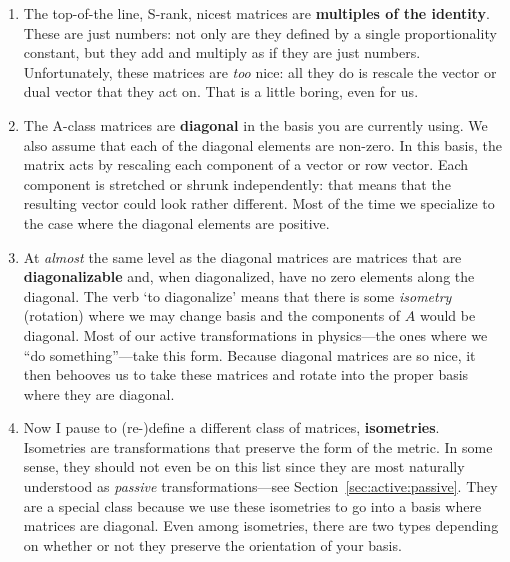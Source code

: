 \begin{enumerate}
    \item The top-of-the line, S-rank, nicest matrices are \textbf{multiples of the identity}. These are just numbers: not only are they defined by a single proportionality constant, but they add and multiply as if they are just numbers. Unfortunately, these matrices are \emph{too} nice: all they do is rescale the vector or dual vector that they act on. That is a little boring, even for us.
    \item The A-class matrices are \textbf{diagonal} in the basis you are currently using. We also assume that each of the diagonal elements are non-zero. In this basis, the matrix acts by rescaling each component of a vector or row vector. Each component is stretched or shrunk independently: that means that the resulting vector could look rather different. Most of the time we specialize to the case where the diagonal elements are positive.
    \item At \emph{almost} the same level as the diagonal matrices are matrices that are \textbf{diagonalizable} and, when diagonalized, have no zero elements along the diagonal. The verb `to diagonalize' means that there is some \emph{isometry} (rotation) where we may change basis and the components of $A$ would be diagonal. Most of our active transformations in physics---the ones where we ``do something''---take this form. Because diagonal matrices are so nice, it then behooves us to take these matrices and rotate into the proper basis where they are diagonal.
    \item Now I pause to (re-)define a different class of matrices, \textbf{isometries}. Isometries are transformations that preserve the form of the metric. In some sense, they should not even be on this list since they are most naturally understood as \emph{passive} transformations---see Section~\ref{sec:active:passive}. They are a special class because we use these isometries to go into a basis where matrices are diagonal. Even among isometries, there are two types depending on whether or not they preserve the orientation of your basis.

\end{enumerate}
